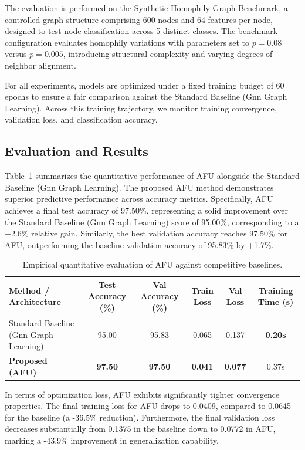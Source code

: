 \documentclass[10pt,twocolumn]{article}
\begin{document}
The evaluation is performed on the Synthetic Homophily Graph Benchmark, a controlled graph structure comprising 600 nodes and 64 features per node, designed to test node classification across 5 distinct classes. The benchmark configuration evaluates homophily variations with parameters set to $p=0.08$ versus $p=0.005$, introducing structural complexity and varying degrees of neighbor alignment. 

For all experiments, models are optimized under a fixed training budget of 60 epochs to ensure a fair comparison against the Standard Baseline (Gnn Graph Learning). Across this training trajectory, we monitor training convergence, validation loss, and classification accuracy.

\subsection{Evaluation and Results}

Table~\ref{tab:empirical_results} summarizes the quantitative performance of \textsc{AFU} alongside the Standard Baseline (Gnn Graph Learning). The proposed \textsc{AFU} method demonstrates superior predictive performance across accuracy metrics. Specifically, \textsc{AFU} achieves a final test accuracy of 97.50\%, representing a solid improvement over the Standard Baseline (Gnn Graph Learning) score of 95.00\%, corresponding to a +2.6\% relative gain. Similarly, the best validation accuracy reaches 97.50\% for \textsc{AFU}, outperforming the baseline validation accuracy of 95.83\% by +1.7\%.

\begin{table}[htbp]
\centering
\caption{Empirical quantitative evaluation of \textsc{AFU} against competitive baselines.}
\label{tab:empirical_results}
\small
\begin{tabular}{lccccc}
\toprule
\textbf{Method / Architecture} & \textbf{Test Accuracy (\%)} & \textbf{Val Accuracy (\%)} & \textbf{Train Loss} & \textbf{Val Loss} & \textbf{Training Time (s)} \\
\midrule
Standard Baseline (Gnn Graph Learning) & 95.00 & 95.83 & 0.065 & 0.137 & \textbf{0.20s} \\
\textbf{Proposed (AFU)} & \textbf{97.50} & \textbf{97.50} & \textbf{0.041} & \textbf{0.077} & 0.37s \\
\bottomrule
\end{tabular}
\end{table}

In terms of optimization loss, \textsc{AFU} exhibits significantly tighter convergence properties. The final training loss for \textsc{AFU} drops to 0.0409, compared to 0.0645 for the baseline (a -36.5\% reduction). Furthermore, the final validation loss decreases substantially from 0.1375 in the baseline down to 0.0772 in \textsc{AFU}, marking a -43.9\% improvement in generalization capability. 
\end{document}
